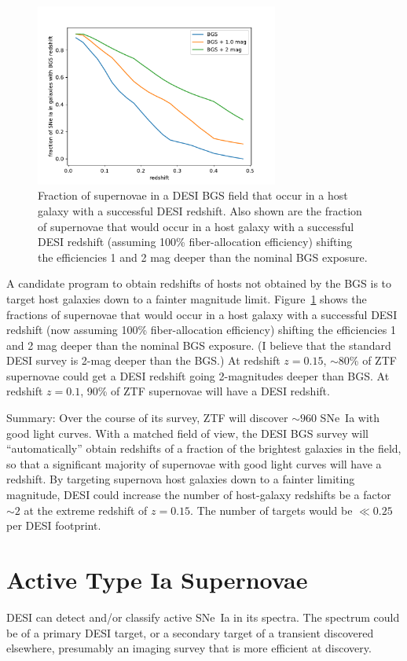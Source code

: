 \documentclass{article}   	%
\begin{document}
\begin{figure}[h]
\includegraphics[width=8cm]{bg_frac.pdf}
\centering
\caption{Fraction of supernovae in a DESI BGS field 
that occur in a host galaxy with a successful DESI redshift.  Also shown are the fraction of supernovae that would occur in a host galaxy
with a successful DESI redshift (assuming 100\% fiber-allocation efficiency) shifting the efficiencies 1 and 2 mag deeper than the nominal BGS exposure.
\label{19.5:fig}}
\end{figure}

A candidate program to obtain redshifts of hosts not obtained by the BGS is to target host galaxies down to a fainter magnitude limit.
Figure~\ref{19.5:fig} shows the fractions of supernovae that would occur in a host galaxy
with a successful DESI redshift (now assuming 100\% fiber-allocation efficiency) shifting the efficiencies 1 and 2 mag deeper than the nominal BGS exposure.
(I believe that the standard DESI survey is 2-mag deeper than the BGS.)
At redshift $z=0.15$,  $\sim 80$\% of ZTF supernovae could get a DESI redshift going 2-magnitudes deeper than BGS.
At redshift $z=0.1$, 90\% of ZTF supernovae will have a DESI redshift.


Summary: Over the course of its survey, ZTF will discover $\sim 960$ SNe~Ia with good light curves.  With a matched field of view,
the DESI BGS survey will ``automatically'' obtain redshifts of a fraction of the brightest galaxies in the field, so that a significant majority
of supernovae with good light curves will have a redshift.   By targeting supernova host galaxies down to a fainter limiting magnitude,
DESI could increase the number of host-galaxy redshifts be a factor $\sim 2$ at the extreme redshift of $z=0.15$.  The number of targets would be
$\ll 0.25$ per DESI footprint.

\section{Active Type Ia Supernovae}
DESI can detect and/or classify active SNe~Ia in its spectra.  The spectrum could be of a primary DESI target, or a secondary target 
of a transient discovered elsewhere, presumably an imaging survey that is more efficient at discovery.
\end{document}

